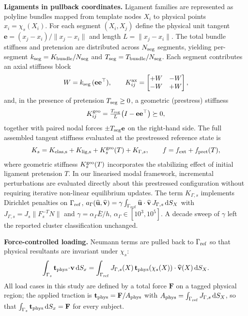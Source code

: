 \documentclass[11pt]{article}
\begin{document}
\noindent\textbf{Ligaments in pullback coordinates.}
Ligament families are represented as polyline bundles mapped from template nodes $X_i$ to physical points $x_i=\chi_s(X_i)$.
For each segment $(X_i,X_j)$ define the physical unit tangent $\mathbf e=(x_j-x_i)/\|x_j-x_i\|$ and length $L=\|x_j-x_i\|$.
The total bundle stiffness and pretension are distributed across $N_{\rm seg}$ segments, yielding per-segment $k_{\rm seg}=K_{\rm bundle}/N_{\rm seg}$ and $T_{\rm seg}=T_{\rm bundle}/N_{\rm seg}$.
Each segment contributes an axial stiffness block
\begin{equation}
W=k_{\rm seg}\,(\mathbf e\mathbf e^\top),\qquad
K^{\rm ax}_{ij}=\begin{bmatrix} +W & -W\\ -W & +W\end{bmatrix},
\end{equation}
and, in the presence of pretension $T_{\rm seg}\ge 0$, a geometric (prestress) stiffness
\begin{equation}
K^{\rm geo}_{ij}=\tfrac{T_{\rm seg}}{L}\big(I-\mathbf e\mathbf e^\top\big)\succeq 0,
\label{eq:kgeo}
\end{equation}
together with paired nodal forces $\pm T_{\rm seg}\mathbf e$ on the right-hand side.
The full assembled tangent stiffness evaluated at the prestressed reference state is
\begin{equation}
K_s=K_{\rm elas,s}+K_{\rm lig,s}+K^{\rm geo}_s(T)+K_{\Gamma,s},\qquad
f=f_{\rm ext}+f_{\rm pret}(T),
\label{eq:K-assembled}
\end{equation}
where geometric stiffness $K^{\rm geo}_s(T)$ incorporates the stabilizing effect of initial ligament pretension $T$. In our linearised modal framework, incremental perturbations are evaluated directly about this prestressed configuration without requiring iterative non-linear equilibrium updates.
The term $K_{\Gamma,s}$ implements Dirichlet penalties on $\Gamma_{\rm ref}$,
$a_\Gamma(\widehat{\mathbf u},\widehat{\mathbf v})=\gamma\int_{\Gamma_{\rm ref}} \widehat{\mathbf u}\cdot\widehat{\mathbf v}\,J_{\Gamma,s}\,\mathrm dS_X$ with $J_{\Gamma,s}=J_s\|F_s^{-T}N\|$ and $\gamma=\alpha_\Gamma\bar E/h$, $\alpha_\Gamma\in[10^3,10^5]$.
A decade sweep of $\gamma$ left the reported cluster classification unchanged.

\noindent\textbf{Force-controlled loading.}
Neumann terms are pulled back to $\Gamma_{\rm ref}$ so that physical resultants are invariant under $\chi_s$:
\begin{equation}
\int_{\Gamma_s}\mathbf t_{\rm phys}\!\cdot\!\mathbf v\,\mathrm dS_x
=\int_{\Gamma_{\rm ref}} J_{\Gamma,s}(X)\,\mathbf t_{\rm phys}(\chi_s(X))\cdot\widehat{\mathbf v}(X)\,\mathrm dS_X.
\label{eq:neumann-pullback}
\end{equation}
All load cases in this study are defined by a total force $\mathbf F$ on a tagged physical region; the applied traction is $\mathbf t_{\rm phys}=\mathbf F/A_{\rm phys}$ with $A_{\rm phys}=\int_{\Gamma_{\rm ref}}J_{\Gamma,s}\,\mathrm dS_X$, so that $\int_{\Gamma_s}\mathbf t_{\rm phys}\,\mathrm dS_x=\mathbf F$ for every subject.
\end{document}
